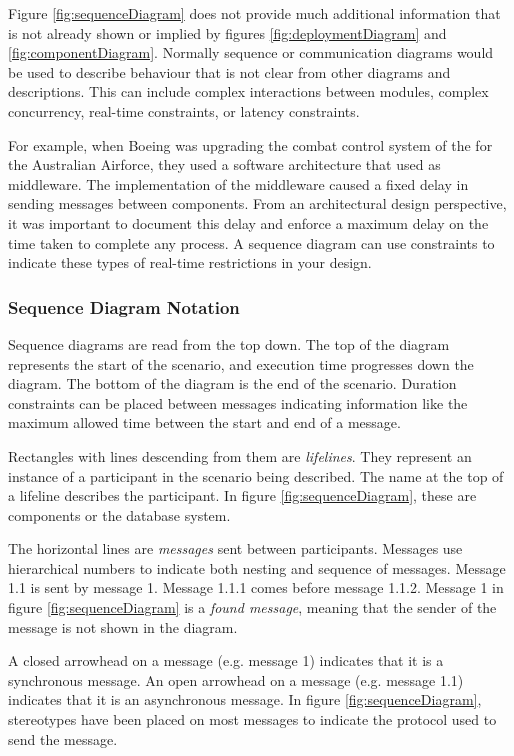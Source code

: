 Figure \ref{fig:sequenceDiagram} does not provide much additional information that is not already shown or implied by
figures \ref{fig:deploymentDiagram} and \ref{fig:componentDiagram}.
Normally sequence or communication diagrams would be used to describe behaviour that is not clear from other diagrams and descriptions.
This can include complex interactions between modules, complex concurrency, real-time constraints, or latency constraints.

\noindent
For example, when Boeing was upgrading the combat control system of the 
for the Australian Airforce, they used a software architecture that used
 as middleware.
The implementation of the middleware caused a fixed delay in sending messages between components.
From an architectural design perspective, it was important to document this delay and enforce a maximum delay on the time taken to complete any process.
A sequence diagram can use constraints to indicate these types of real-time restrictions in your design.

\subsubsection{Sequence Diagram Notation}\label{sec:sequenceNotation}
Sequence diagrams are read from the top down.
The top of the diagram represents the start of the scenario, and execution time progresses down the diagram.
The bottom of the diagram is the end of the scenario.
Duration constraints can be placed between messages indicating information like the maximum allowed time between the start and end of a message.

Rectangles with lines descending from them are \emph{lifelines}.
They represent an instance of a participant in the scenario being described.
The name at the top of a lifeline describes the participant.
In figure \ref{fig:sequenceDiagram}, these are components or the database system.

The horizontal lines are \emph{messages} sent between participants.
Messages use hierarchical numbers to indicate both nesting and sequence of messages.
Message 1.1 is sent by message 1. Message 1.1.1 comes before message 1.1.2.
Message 1 in figure \ref{fig:sequenceDiagram} is a \emph{found message}, meaning that the sender of the message is not shown in the diagram.

A closed arrowhead on a message (e.g. message 1) indicates that it is a synchronous message.
An open arrowhead on a message (e.g. message 1.1) indicates that it is an asynchronous message.
In figure \ref{fig:sequenceDiagram}, stereotypes have been placed on most messages to indicate the protocol used to send the message.

